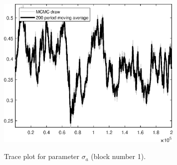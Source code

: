 \begin{figure}[H]
\centering
  \includegraphics[width=0.8\textwidth]{RBC_growth/graphs/TracePlot_sigma_a_blck_1}\\
    \caption{Trace plot for parameter ${\sigma_a}$ (block number 1).}
\end{figure}
